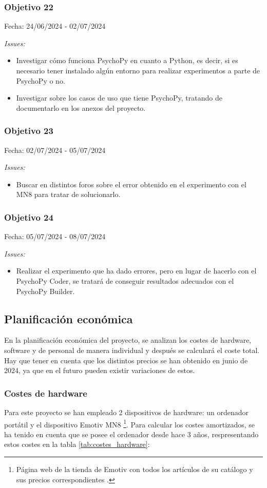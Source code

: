 \subsubsection{Objetivo 22}
Fecha: 24/06/2024 - 02/07/2024

\textit{Issues:}
\begin{itemize}
    \item Investigar cómo funciona PsychoPy en cuanto a Python, es decir, si es necesario tener instalado algún entorno para realizar experimentos a parte de PsychoPy o no.
    \item Investigar sobre los casos de uso que tiene PsychoPy, tratando de documentarlo en los anexos del proyecto.
\end{itemize}

\subsubsection{Objetivo 23}
Fecha: 02/07/2024 - 05/07/2024

\textit{Issues:}
\begin{itemize}
    \item Buscar en distintos foros sobre el error obtenido en el experimento con el MN8 para tratar de solucionarlo.
\end{itemize}

\subsubsection{Objetivo 24}
Fecha: 05/07/2024 - 08/07/2024

\textit{Issues:}
\begin{itemize}
    \item Realizar el experimento que ha dado errores, pero en lugar de hacerlo con el PsychoPy Coder, se tratará de conseguir resultados adecuados con el PsychoPy Builder.
\end{itemize}

\subsection{Planificación económica}
En la planificación económica del proyecto, se analizan los costes de hardware, software y de personal de manera individual y después se calculará el coste total. Hay que tener en cuenta que los distintos precios se han obtenido en junio de 2024, ya que en el futuro pueden existir variaciones de estos.

\subsubsection{Costes de hardware}
Para este proyecto se han empleado 2 dispositivos de hardware: un ordenador portátil y el dispositivo Emotiv MN8 \cite{EmotivShop} \footnote{Página web de la tienda de Emotiv con todos los artículos de su catálogo y sus precios correspondientes \cite{EmotivShop}.}. Para calcular los costes amortizados, se ha tenido en cuenta que se posee el ordenador desde hace 3 años, respresentando estos costes en la tabla \ref{tab:costes_hardware}:

